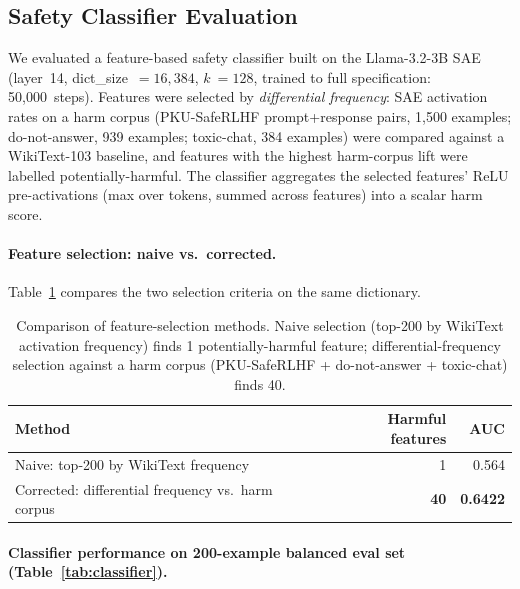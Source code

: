 \documentclass[11pt]{article}
\begin{document}
\subsection{Safety Classifier Evaluation}
\label{sec:safety}

We evaluated a feature-based safety classifier built on the Llama-3.2-3B SAE (layer~14, dict\_size~$= 16{,}384$, $k~= 128$, trained to full specification: 50,000~steps). Features were selected by \emph{differential frequency}: SAE activation rates on a harm corpus (PKU-SafeRLHF prompt+response pairs, 1,500 examples; do-not-answer, 939 examples; toxic-chat, 384 examples) were compared against a WikiText-103 baseline, and features with the highest harm-corpus lift were labelled potentially-harmful. The classifier aggregates the selected features' ReLU pre-activations (max over tokens, summed across features) into a scalar harm score.

\paragraph{Feature selection: naive vs.\ corrected.} Table~\ref{tab:labels} compares the two selection criteria on the same dictionary.

\begin{table}[h]
\centering
\caption{Comparison of feature-selection methods. Naive selection (top-200 by WikiText activation frequency) finds 1 potentially-harmful feature; differential-frequency selection against a harm corpus (PKU-SafeRLHF + do-not-answer + toxic-chat) finds 40.}
\label{tab:labels}
\begin{tabular}{@{}lrr@{}}
\toprule
Method & Harmful features & AUC \\
\midrule
Naive: top-200 by WikiText frequency & 1 & 0.564 \\
Corrected: differential frequency vs.\ harm corpus & \textbf{40} & \textbf{0.6422} \\
\bottomrule
\end{tabular}
\end{table}

\paragraph{Classifier performance on 200-example balanced eval set (Table~\ref{tab:classifier}).}
\end{document}
